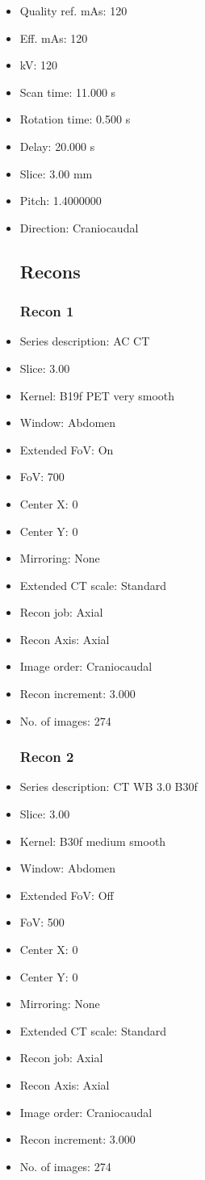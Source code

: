 \documentclass[12pt]{article}
\begin{document}
\begin{itemize}[noitemsep]
\subsection{Scan}
\item Quality ref. mAs: 120\item Eff. mAs: 120\item kV: 120\item Scan time: 11.000 s\item Rotation time: 0.500 s\item Delay: 20.000 s\item Slice: 3.00 mm\item Pitch: 1.4000000\item Direction: Craniocaudal\subsection{Recons}

\subsubsection{Recon 1}
\item Series description: AC CT
\item Slice: 3.00
\item Kernel: B19f PET very smooth
\item Window: Abdomen
\item Extended FoV: On
\item FoV: 700
\item Center X: 0
\item Center Y: 0
\item Mirroring: None
\item Extended CT scale: Standard
\item Recon job: Axial
\item Recon Axis: Axial
\item Image order: Craniocaudal
\item Recon increment: 3.000
\item No. of images: 274
\subsubsection{Recon 2}
\item Series description: CT WB 3.0 B30f
\item Slice: 3.00
\item Kernel: B30f medium smooth
\item Window: Abdomen
\item Extended FoV: Off
\item FoV: 500
\item Center X: 0
\item Center Y: 0
\item Mirroring: None
\item Extended CT scale: Standard
\item Recon job: Axial
\item Recon Axis: Axial
\item Image order: Craniocaudal
\item Recon increment: 3.000
\item No. of images: 274

\end{itemize}
\end{document}
